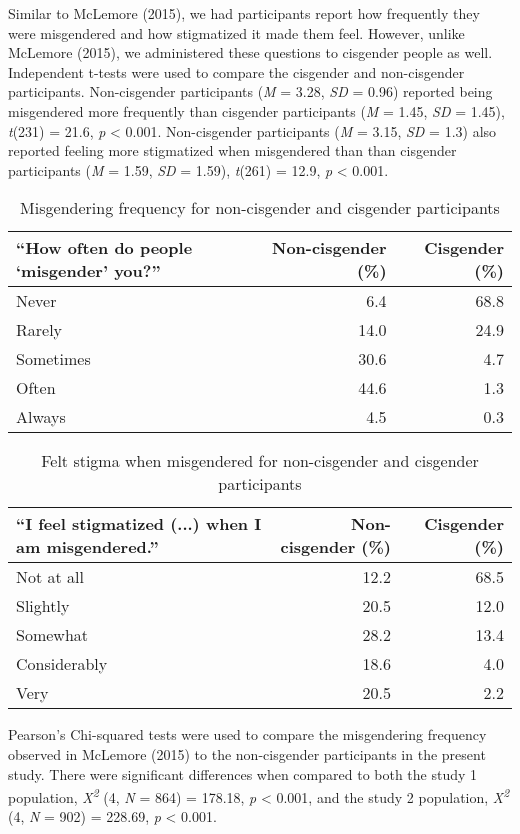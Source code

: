 \documentclass[12pt,twoside]{reedthesis}
\begin{document}
Similar to McLemore (2015), we had participants report how frequently they were misgendered and how stigmatized it made them feel. However, unlike McLemore (2015), we administered these questions to cisgender people as well. Independent t-tests were used to compare the cisgender and non-cisgender participants. Non-cisgender participants (\emph{M} = 3.28, \emph{SD} = 0.96) reported being misgendered more frequently than cisgender participants (\emph{M} = 1.45, \emph{SD} = 1.45), \emph{t}(231) = 21.6, \emph{p} \textless{} 0.001.
Non-cisgender participants (\emph{M} = 3.15, \emph{SD} = 1.3) also reported feeling more stigmatized when misgendered than than cisgender participants (\emph{M} = 1.59, \emph{SD} = 1.59), \emph{t}(261) = 12.9, \emph{p} \textless{} 0.001.
\begin{longtable}[t]{lrr}
\caption{\label{tab:unnamed-chunk-3}Misgendering frequency for non-cisgender and cisgender participants}\\
\toprule
“How often do people ‘misgender’ you?” & Non-cisgender (\%) & Cisgender (\%)\\
\midrule
Never & 6.4 & 68.8\\
Rarely & 14.0 & 24.9\\
Sometimes & 30.6 & 4.7\\
Often & 44.6 & 1.3\\
Always & 4.5 & 0.3\\
\bottomrule
\end{longtable}
\begin{longtable}[t]{lrr}
\caption{\label{tab:unnamed-chunk-4}Felt stigma when misgendered for non-cisgender and cisgender participants}\\
\toprule
“I feel stigmatized (...) when I am misgendered.” & Non-cisgender (\%) & Cisgender (\%)\\
\midrule
Not at all & 12.2 & 68.5\\
Slightly & 20.5 & 12.0\\
Somewhat & 28.2 & 13.4\\
Considerably & 18.6 & 4.0\\
Very & 20.5 & 2.2\\
\bottomrule
\end{longtable}
Pearson's Chi-squared tests were used to compare the misgendering frequency observed in McLemore (2015) to the non-cisgender participants in the present study.
There were significant differences when compared to both the study 1 population, \emph{X\textsuperscript{2}} (4, \emph{N} = 864) = 178.18, \emph{p} \textless{} 0.001, and the study 2 population, \emph{X\textsuperscript{2}} (4, \emph{N} = 902) = 228.69, \emph{p} \textless{} 0.001.
\end{document}
